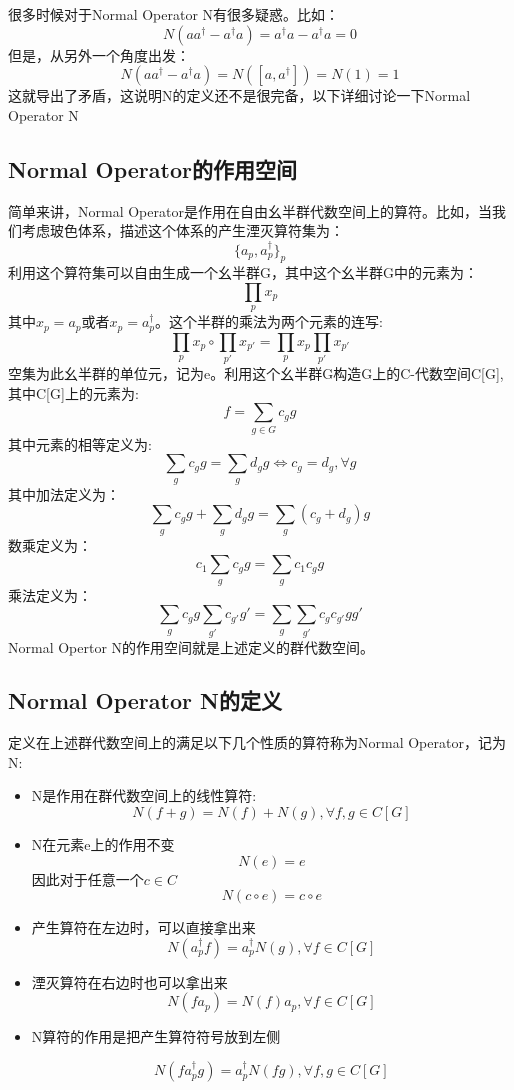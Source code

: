很多时候对于Normal Operator N有很多疑惑。比如：
\[N(aa^\dagger-a^\dagger a)=a^\dagger a-a^\dagger a=0\]
但是，从另外一个角度出发：
\[N(aa^\dagger-a^\dagger a)=N([a,a^\dagger])=N(1)=1\]
这就导出了矛盾，这说明N的定义还不是很完备，以下详细讨论一下Normal Operator N\par
\subsection{Normal Operator的作用空间}
简单来讲，Normal Operator是作用在自由幺半群代数空间上的算符。比如，当我们考虑玻色体系，描述这个体系的产生湮灭算符集为：
\[\{a_p,a_p^\dagger\}_p\]
利用这个算符集可以自由生成一个幺半群G，其中这个幺半群G中的元素为：
\[\prod_p x_p\]
其中$x_p=a_p$或者$x_p=a_p^\dagger$。这个半群的乘法为两个元素的连写:
\[\prod_p x_p\circ \prod_{p'} x_{p'}=\prod_p x_p\prod_{p'} x_{p'}\]
空集为此幺半群的单位元，记为e。利用这个幺半群G构造G上的C-代数空间C[G],其中C[G]上的元素为:
\[f=\sum_{g\in G} c_g g\]
其中元素的相等定义为:
\[\sum_g c_g g=\sum_g d_g g \Leftrightarrow c_g=d_g,\forall g\]
其中加法定义为：
\[\sum_g c_g g+\sum_g d_g g=\sum_g (c_g+d_g) g\]
数乘定义为：
\[c_1\sum_g c_g g=\sum_g c_1c_g g\]
乘法定义为：
\[\sum_g c_g g\sum_{g'} c_{g'} g'=\sum_g\sum_{g'}c_gc_{g'}gg'\]
Normal Opertor N的作用空间就是上述定义的群代数空间。
\subsection{Normal Operator N的定义}
定义在上述群代数空间上的满足以下几个性质的算符称为Normal Operator，记为N:
\begin{itemize}
\item{N是作用在群代数空间上的线性算符}:
\[N(f+g)=N(f)+N(g),\forall f,g\in C[G]\]
\item{N在元素e上的作用不变}
\[N(e)=e\]
因此对于任意一个$c\in C$
\[N(c\circ e)=c\circ e\]
\item{产生算符在左边时，可以直接拿出来}
\[N(a_p^\dagger f)=a_p^\dagger N(g) ,\forall f \in C[G]\]
\item{湮灭算符在右边时也可以拿出来}
\[N(fa_p)=N(f)a_p,\forall f \in C[G]\]
\item{N算符的作用是把产生算符符号放到左侧\par}
\[N(fa_p^\dagger g)=a_p^\dagger N(fg),\forall f,g\in C[G]\]
\end{itemize}
